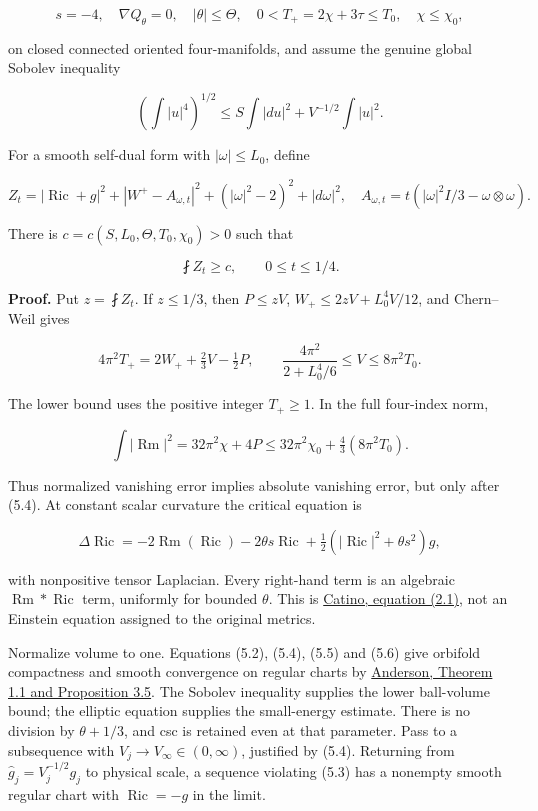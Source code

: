 \documentclass[
  10pt,
]{article}
\begin{document}
\[
 s=-4,\quad \nabla Q_\theta=0,\quad |\theta|\le\Theta,
 \quad 0<T_+=2\chi+3\tau\le T_0,\quad\chi\le\chi_0,          \tag{5.1}
\]

on closed connected oriented four-manifolds, and assume the genuine
global Sobolev inequality

\[
 \left(\int|u|^4\right)^{1/2}
       \le S\int|du|^2+V^{-1/2}\int|u|^2.                     \tag{5.2}
\]

For a smooth self-dual form with \(|\omega|\le L_0\), define

\[
 Z_t=|\operatorname{Ric}+g|^2+|W^+-A_{\omega,t}|^2
                    +(|\omega|^2-2)^2+|d\omega|^2,
 \quad A_{\omega,t}=t(|\omega|^2I/3-\omega\otimes\omega).
\]

There is \(c=c(S,L_0,\Theta,T_0,\chi_0)>0\) such that

\[
                    \fint Z_t\ge c,\qquad0\le t\le1/4.       \tag{5.3}
\]

\textbf{Proof.} Put \(z=\fint Z_t\). If \(z\le1/3\), then \(P\le zV\),
\(W_+\le2zV+L_0^4V/12\), and Chern--Weil gives

\[
 4\pi^2T_+=2W_++\tfrac23V-\tfrac12P,
 \qquad
 \frac{4\pi^2}{2+L_0^4/6}\le V\le8\pi^2T_0.                  \tag{5.4}
\]

The lower bound uses the positive integer \(T_+\ge1\). In the full
four-index norm,

\[
 \int|\operatorname{Rm}|^2=32\pi^2\chi+4P
                       \le32\pi^2\chi_0+\tfrac43(8\pi^2T_0). \tag{5.5}
\]

Thus normalized vanishing error implies absolute vanishing error, but
only after (5.4). At constant scalar curvature the critical equation is

\[
 \Delta\operatorname{Ric}=-2\operatorname{Rm}(\operatorname{Ric})
 -2\theta s\operatorname{Ric}
            +\tfrac12(|\operatorname{Ric}|^2+\theta s^2)g,     \tag{5.6}
\]

with nonpositive tensor Laplacian. Every right-hand term is an algebraic
\(\operatorname{Rm}*\operatorname{Ric}\) term, uniformly for bounded
\(\theta\). This is \href{https://arxiv.org/pdf/1404.0569}{Catino,
equation (2.1)}, not an Einstein equation assigned to the original
metrics.

Normalize volume to one. Equations (5.2), (5.4), (5.5) and (5.6) give
orbifold compactness and smooth convergence on regular charts by
\href{https://arxiv.org/pdf/math/0312111}{Anderson, Theorem 1.1 and
Proposition 3.5}. The Sobolev inequality supplies the lower ball-volume
bound; the elliptic equation supplies the small-energy estimate. There
is no division by \(\theta+1/3\), and csc is retained even at that
parameter. Pass to a subsequence with \(V_j\to V_\infty\in(0,\infty)\),
justified by (5.4). Returning from \(\widehat g_j=V_j^{-1/2}g_j\) to
physical scale, a sequence violating (5.3) has a nonempty smooth regular
chart with \(\operatorname{Ric}=-g\) in the limit.
\end{document}
